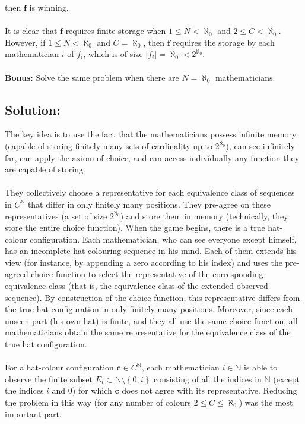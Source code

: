 \documentclass[11pt, a4paper, oneside]{article}
\newcommand{\solution}[1][]{\subsection*{#1}\hfill \par}
\theoremstyle{remark}
\theoremstyle{lemma}
\begin{document}
then \(\mathbf{f}\) is winning.
\\\\
It is clear that \(\mathbf{f}\) requires finite storage when \(1 \leq N < \aleph_0\) and \(2 \leq C < \aleph_0\). However, if \(1 \leq N < \aleph_0\) and \(C = \aleph_0\), then \(\mathbf{f}\) requires the storage by each mathematician \(i\) of \(f_i\), which is of size \(\left| f_i \right| = \aleph_0 < 2^{\aleph_0}\).
\\\\
\textbf{Bonus:} Solve the same problem when there are \( N = \aleph_0 \) mathematicians.
\solution[Solution:]
The key idea is to use the fact that the mathematicians possess infinite memory (capable of storing finitely many sets of cardinality up to \( 2^{\aleph_0} \)), can see infinitely far, can apply the axiom of choice, and can access individually any function they are capable of storing.
\\\\
They collectively choose a representative for each equivalence class of sequences in \( C^{\mathbb{N}} \) that differ in only finitely many positions. They pre-agree on these representatives (a set of size \( 2^{\aleph_0} \)) and store them in memory (technically, they store the entire choice function). When the game begins, there is a true hat-colour configuration. Each mathematician, who can see everyone except himself, has an incomplete hat-colouring sequence in his mind. Each of them extends his view (for instance, by appending a zero according to his index) and uses the pre-agreed choice function to select the representative of the corresponding equivalence class (that is, the equivalence class of the extended observed sequence). By construction of the choice function, this representative differs from the true hat configuration in only finitely many positions. Moreover, since each unseen part (his own hat) is finite, and they all use the same choice function, all mathematicians obtain the same representative for the equivalence class of the true hat configuration.
\\\\
For a hat-colour configuration \( \mathbf{c} \in C^{\mathbb{N}} \), each mathematician \( i \in \mathbb{N} \) is able to observe the finite subset \( E_i \subset \mathbb{N} \setminus \left\{ 0, i \right\} \) consisting of all the indices in \( \mathbb{N} \) (except the indices \( i \) and \( 0 \)) for which \( \mathbf{c} \) does not agree with its representative. Reducing the problem in this way (for any number of colours \( 2 \leq C \leq \aleph_0 \)) was the most important part.
\end{document}
